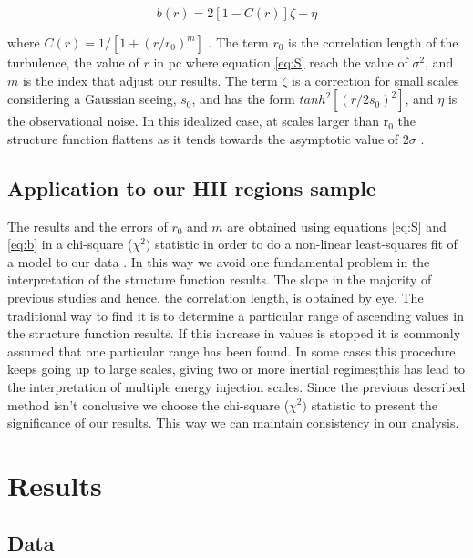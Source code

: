 \documentclass[fleqn,usenatbib, useAMS, a4paper]{mnras}
\begin{document}
\begin{equation}\label{eq:b}
b(r)=2[1-C(r)]\zeta+\eta
\end{equation}

where $C(r)=1/[1+(r/r_{0})^{m}]$ \citep{1984ApJ...277..556S,arthur2016turbulence}.
The term $r_{0}$ is the correlation length of the turbulence, the value of \(r\) in pc where equation \ref{eq:S} reach the value of \(\sigma^2\), and $m$ is the index that adjust our results.
The term $\zeta$ is a correction for small scales considering a Gaussian seeing, $s_{0}$, and has the form $tanh^{2}[(r/2s_{0})^2]$, and \(\eta\) is the observational noise. 
In this idealized case, at scales larger than r$_{0}$ the structure function flattens as it tends towards the asymptotic value of 2$\sigma$ \citep{arthur2016turbulence}.

\subsection{Application to our HII regions sample}\label{sec:apply}

The results and the errors of $r_{0}$ and $m$ are obtained using equations \ref{eq:S} and \ref{eq:b} in a chi-square (\(\chi^2)\) statistic in order to do a non-linear least-squares fit of a model to our data \citep{newville_matthew_2014_11813}. 
In this way we avoid one fundamental problem in the interpretation of the structure function results. The slope in the majority of previous studies and hence, the correlation length, is obtained by eye. 
The traditional way to find it is to determine a particular range of ascending values in the structure function results. 
If this increase in values is stopped it is commonly assumed that one particular range has been found. 
In some cases this procedure keeps going up to large scales, giving two or more inertial regimes;this has lead to the interpretation of multiple energy injection scales.
Since the previous described method isn't conclusive we choose the chi-square (\(\chi^2)\) statistic to present the significance of our results. 
This way we can maintain consistency in our analysis.


\section{Results}\label{sec:results}

\subsection{Data}
\end{document}
